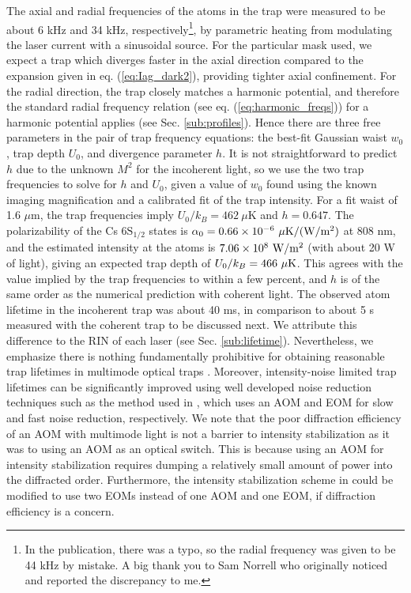 The axial and radial frequencies of the atoms in the trap were measured to be about 6 kHz and 34 kHz, respectively\footnote{In the publication, there was a typo, so the radial frequency was given to be 44 kHz by mistake. A big thank you to Sam Norrell who originally noticed and reported the discrepancy to me.}, by parametric heating from modulating the laser current with a sinusoidal source. For the particular mask used, we expect a trap which diverges faster in the axial direction compared to the expansion given in eq. (\ref{eq:Iag_dark2}), providing tighter axial confinement. For the radial direction, the trap closely matches a harmonic potential, and therefore the standard radial frequency relation (see eq. (\ref{eq:harmonic_freqs})) for a harmonic potential applies (see Sec. \ref{sub:profiles}). Hence there are three free parameters in the pair of trap frequency equations: the best-fit Gaussian waist $w_0$, trap depth $U_0$, and divergence parameter $h$. It is not straightforward to predict $h$ due to the unknown $M^2$ for the incoherent light, so we use the two trap frequencies to solve for $h$ and $U_0$, given a value of $w_0$ found using the known imaging magnification and a calibrated fit of the trap intensity. For a fit waist of 1.6 $\mu \mathrm{m}$, the trap frequencies imply $U_0/k_B=462 ~\mu$K and $h=0.647$. The polarizability of the Cs $6\text{S}_{1/2}$ states is
$\alpha_0 = 0.66\times10^{-6} ~\mu\text K/(\text W/\text m^2)$ at 808 nm, and the estimated intensity at the atoms is $7.06 \times 10^8~\text W/ \text m^2$ (with about 20 W of light), giving an expected trap depth of $U_0/k_B=466 ~\mu \text K$. This agrees with the value implied by the trap frequencies to within a few percent, and $h$ is of the same order as the numerical prediction with coherent light. 
The observed atom lifetime in the incoherent trap was about 40 ms, in comparison to about 5 s measured with the coherent trap to be discussed next. We attribute this difference to the RIN of each laser (see Sec. \ref{sub:lifetime}). Nevertheless, we emphasize there is nothing fundamentally prohibitive for obtaining reasonable trap lifetimes in  multimode optical traps \cite{WHung2015,Povilus2005}. Moreover, intensity-noise limited trap lifetimes can be significantly improved  using well developed noise reduction techniques such as the method used in \cite{YuWang2020}, which uses an AOM and EOM for slow and fast noise reduction, respectively. We note that the poor diffraction efficiency of an AOM with multimode light is not a barrier to intensity stabilization as it was to using an AOM as an optical switch. This is because using an AOM for intensity stabilization requires dumping a relatively small amount of power into the diffracted order. Furthermore, the intensity stabilization scheme in \cite{YuWang2020} could be modified to use two EOMs instead of one AOM and one EOM, if diffraction efficiency is a concern. 

